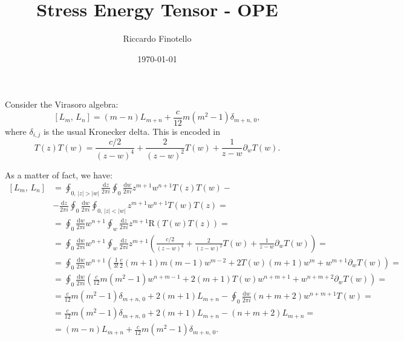 \documentclass[10pt,a4paper]{article}
\author{Riccardo Finotello}
\title{Stress Energy Tensor - OPE}
\date{\today}
\numberwithin{equation}{subsection}
\numberwithin{figure}{subsection}
\numberwithin{table}{subsection}
\begin{document}
    \maketitle

    Consider the Virasoro algebra:
    \begin{equation*}
        \left[ L_m,\, L_n \right] = \left( m - n \right) L_{m+n} + \frac{c}{12}
        m \left( m^2 - 1 \right) \delta_{m+n,\,0},
    \end{equation*}
    where $\delta_{i,j}$ is the usual Kronecker delta. This is encoded in
    \begin{equation*}
        T\left( z \right) T\left( w \right) = \frac{c/2}{\left( z - w
        \right)^4} + \frac{2}{\left( z - w \right)^2} T\left( w \right) +
        \frac{1}{z - w} \partial_w T\left( w \right).
    \end{equation*}

    As a matter of fact, we have:
    \begin{align*}
        \left[ L_m,\, L_n \right] &= \oint_{0,\, \left| z \right| > \left| w
        \right|} \frac{\mathrm{d}z}{2\pi i} \oint_0 \frac{\mathrm{d}w}{2\pi i}
        z^{m+1} w^{n+1} T\left( z \right) T\left( w \right) -
        \\
        &- \frac{\mathrm{d}z}{2\pi i} \oint_0 \frac{\mathrm{d}w}{2\pi i}
        \oint_{0,\, \left| z \right| < \left| w \right|} z^{m+1} w^{n+1}
        T\left( w \right) T\left( z \right) =
        \\
        &= \oint_0 \frac{\mathrm{d}w}{2\pi i} w^{n+1} \oint_w
        \frac{\mathrm{d}z}{2\pi i} z^{m+1} \mathrm{R}\left( T\left( w \right)
        T\left( z \right) \right) =
        \\
        &= \oint_0 \frac{\mathrm{d}w}{2\pi i} w^{n+1} \oint_w
        \frac{\mathrm{d}z}{2\pi i} z^{m+1} \left( \frac{c/2}{\left( z - w
        \right)^4} + \frac{2}{\left( z - w \right)^2} T\left( w \right) +
        \frac{1}{z - w} \partial_w T\left( w \right) \right) =
        \\
        &= \oint_0 \frac{\mathrm{d}w}{2\pi i} w^{n+1} \left( \frac{1}{3!}
        \frac{c}{2} \left( m + 1 \right) m \left( m - 1 \right) w^{m-2} + 2
        T\left( w \right) \left( m + 1 \right) w^m + w^{m+1} \partial_w T\left(
        w \right) \right) =
        \\
        &= \oint_0 \frac{\mathrm{d}w}{2\pi i} \left( \frac{c}{12} m \left( m^2
        - 1 \right) w^{n+m-1} + 2 \left( m+1 \right) T\left( w \right)
        w^{n+m+1} + w^{n+m+2} \partial_w T\left( w \right) \right) =
        \\
        &= \frac{c}{12} m \left( m^2 - 1 \right) \delta_{m+n,\,0} + 2 \left( m
        + 1 \right) L_{m+n} - \oint_0 \frac{\mathrm{d}w}{2\pi i} \left( n + m +
        2 \right) w^{n+m+1} T\left( w \right) =
        \\
        &= \frac{c}{12} m \left( m^2 - 1 \right) \delta_{m+n,\,0} + 2 \left( m
        + 1 \right) L_{m+n} - \left( n + m + 2 \right) L_{m+n} =
        \\
        &= \left( m - n \right) L_{m+n} + \frac{c}{12} m \left( m^2 - 1 \right)
        \delta_{m+n,\,0}.
    \end{align*}
\end{document}
